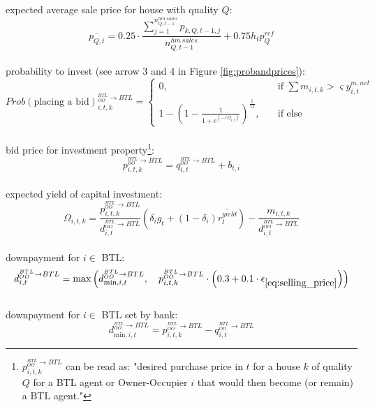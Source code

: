 \documentclass[]{article}
\begin{document}
expected average sale price for house with quality $Q$:
\begin{equation} \label{eq:average_sale_price}
	\overline{p_{Q, t}}= 0.25\cdot \dfrac{\sum_{j=1}^{n^{hm\ sales}_{Q, t-1}}{p_{k, Q, t-1, j}}}{n^{hm\ sales}_{Q, t-1}}+ 0.75h_{t}p^{ref}_{Q}
\end{equation}
\\
probability to invest (see arrow 3 and 4 in Figure \ref{fig:probandprices}):
\begin{equation} \label{eq:probabilitiy_invest}
Prob(\text{placing a bid})^{^{BTL}_{OO} \rightarrow BTL}_{i,t,k} = 
\begin{cases}
0, &\quad \text{if $\sum m_{i,t,k} > \varsigma y_{i,t}^{m,net}$}\\
1-\left(1-\tfrac{1}{1+e^{(-\tau\Omega_{ i,t})}}\right)^{\frac{1}{12}},&\quad \text{if else} 
\end{cases}
\end{equation}
\\
bid price for investment property\footnote{$p^{^{BTL}_{OO}\rightarrow BTL}_{i,t,k}$ can be read as: "desired purchase price in $t$ for a house $k$ of quality $Q$ for a BTL agent or Owner-Occupier $i$ that would then become (or remain) a BTL agent."}:
\begin{equation} \label{eq:bid_price_BTL}
	p^{^{BTL}_{OO} \rightarrow BTL}_{i,t,k} = q^{^{BTL}_{OO} \rightarrow BTL}_{i,t} + b_{t,i}
\end{equation}
\\
expected yield of capital investment:
\begin{equation} \label{eq:expected_yield_buy}
	\Omega_{i,t,k} = \frac{p^{^{BTL}_{OO}\rightarrow BTL}_{i,t,k}}{d^{^{BTL}_{OO}\rightarrow BTL}_{i,t}}(\delta_{i}g_{t} + (1-\delta_{i})\overline{r^{yield}_{t}}) - \frac{m_{i,t,k}}{d^{^{BTL}_{OO}\rightarrow BTL}_{i,t}}
\end{equation}
\\
downpayment for $i \in$ BTL:
\begin{equation}\label{eq:downpayment_BTL}
d^{^{BTL}_{OO}\rightarrow BTL}_{i,t}=\max \left(d^{^{BTL}_{OO}\rightarrow BTL}_{\text{min},i,t}, \quad p^{^{BTL}_{OO} \rightarrow BTL}_{i,t,k}\cdot \left(0.3 +0.1\cdot\epsilon_{\eqref{eq:selling_price}}\right)\right)
\end{equation}
\\
downpayment for $i \in$ BTL set by bank:
\begin{equation} \label{eq:min_d_BTL}
d^{^{BTL}_{OO}\rightarrow BTL}_{\text{min},i, t}=p^{^{BTL}_{OO} \rightarrow BTL}_{i,t,k}-q^{^{BTL}_{OO}\rightarrow BTL}_{i,t}
\end{equation}
\end{document}
